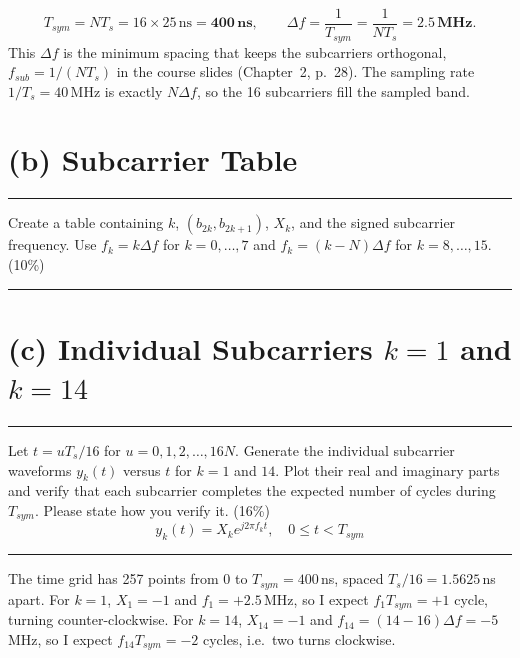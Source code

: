 \documentclass[12pt,a4paper]{report}
\newcommand{\question}[1]{%
    \hrule
    \vspace{0.2cm}
    #1
    \vspace{0.2cm}
    \hrule
    \vspace{0.5cm}
}
\newcommand{\Tsym}{T_{sym}}
\begin{document}
\begin{equation}
    \Tsym = N T_s = 16 \times 25\,\text{ns} = \mathbf{400\,ns}, \qquad
    \Delta f = \frac{1}{\Tsym} = \frac{1}{N T_s} = \mathbf{2.5\,MHz}.
\end{equation}
This $\Delta f$ is the minimum spacing that keeps the subcarriers orthogonal, $f_{sub} = 1/(NT_s)$ in the
course slides (Chapter~2, p.~28). The sampling rate $1/T_s = 40$\,MHz is exactly $N\Delta f$, so the
16 subcarriers fill the sampled band.

\section{(b) Subcarrier Table}

\question{Create a table containing $k$, $(b_{2k}, b_{2k+1})$, $X_k$, and the signed subcarrier frequency.
Use $f_k = k\Delta f$ for $k = 0, \ldots, 7$ and $f_k = (k - N)\Delta f$ for $k = 8, \ldots, 15$. (10\%)}

\begin{table}[H]
\centering
\caption{Subcarrier Mapping and Signed Frequencies (generated by \texttt{01\_src/q2.m})}
\setlength{\tabcolsep}{8pt}
\renewcommand{\arraystretch}{1.2}

\end{table}

\newpage

\section{(c) Individual Subcarriers $k = 1$ and $k = 14$}

\question{Let $t = uT_s/16$ for $u = 0, 1, 2, \ldots, 16N$. Generate the individual subcarrier waveforms
$y_k(t)$ versus $t$ for $k = 1$ and $14$. Plot their real and imaginary parts and verify that each subcarrier
completes the expected number of cycles during $\Tsym$. Please state how you verify it. (16\%)
\[ y_k(t) = X_k e^{j2\pi f_k t}, \quad 0 \le t < \Tsym \]}

The time grid has 257 points from $0$ to $\Tsym = 400$\,ns, spaced $T_s/16 = 1.5625$\,ns apart.
For $k = 1$, $X_1 = -1$ and $f_1 = +2.5$\,MHz, so I expect $f_1\Tsym = +1$ cycle, turning counter-clockwise.
For $k = 14$, $X_{14} = -1$ and $f_{14} = (14-16)\Delta f = -5$\,MHz, so I expect $f_{14}\Tsym = -2$ cycles,
i.e.\ two turns clockwise.
\end{document}
